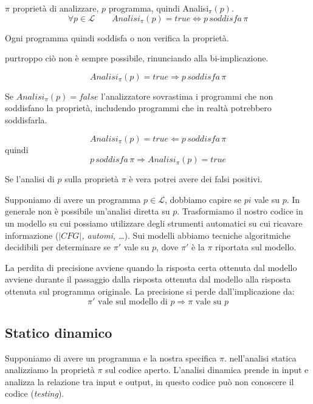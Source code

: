 $\pi$ proprietà di analizzare, $p$ programma, quindi Analisi$_{\pi}(p)$.
\[
    \forall p \in \mathcal{L}\qquad
    Analisi_{\pi}(p) = \textit{true} \Leftrightarrow p \, \textit{soddisfa} \,\pi
\]

Ogni programma quindi soddisfa o non verifica la proprietà.

purtroppo ciò non è sempre possibile, rinunciando alla bi-implicazione.

\begin{tcolorbox}[title =Soundness (\textit{Correttezza})]
\[ Analisi_{\pi}(p) = true \Rightarrow p \,\textit{soddisfa} \,\pi \]
\end{tcolorbox}
Se $Analisi_{\pi}(p) = false$ l'analizzatore sovrastima i programmi che non soddisfano la proprietà,
includendo programmi che in realtà potrebbero soddisfarla.


\begin{tcolorbox}[title={Completezza}]
\[ Analisi_{\pi}(p) = true \Leftarrow p \,\textit{soddisfa} \,\pi \]
quindi
\[ p \,\textit{soddisfa} \,\pi \Rightarrow Analisi_{\pi}(p) = true \]
\end{tcolorbox}
Se l'analisi di $p$ sulla proprietà $\pi$ è vera potrei avere dei falsi positivi.

Supponiamo di avere un programma $p \in \mathcal{L}$, dobbiamo capire se $pi$ vale su $p$. In generale non è possibile un'analisi 
diretta su $p$. Trasformiamo il nostro codice in un modello su cui possiamo utilizzare degli strumenti automatici 
su cui ricavare informazione (\textit{$\texttt|CFG|$, automi, \dots}). Sui modelli abbiamo tecniche 
algoritmiche decidibili per determinare se $\pi'$ vale su $p$, dove $\pi'$ è la $\pi$ riportata
sul modello.

La perdita di precisione avviene quando la risposta certa ottenuta dal modello avviene durante il passaggio dalla risposta ottenuta 
dal modello alla risposta ottenuta sul programma originale. La precisione si perde dall'implicazione da:
\[
  \pi' \text{ vale sul modello di } p \Longrightarrow \pi \text{ vale su } p
\]
\subsection{Statico dinamico}
Supponiamo di avere un programma e la nostra specifica $\pi$. nell'analisi statica analizziamo 
la proprietà $\pi$ sul codice aperto.
L'analisi dinamica prende in input e analizza la relazione tra input e output, in questo codice 
può non conoscere il codice (\textit{testing}).
